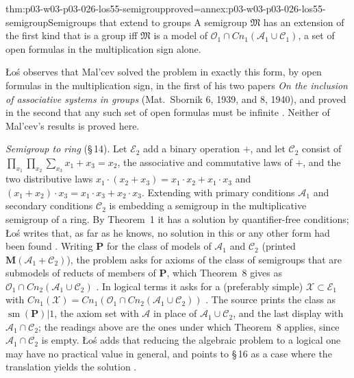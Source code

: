 \begin{hbcorollary}{thm:p03-w03-p03-026-los55-semigroup}{proved=annex:p03-w03-p03-026-los55-semigroup}{Semigroups that extend to groups}
A semigroup \(\mathfrak M\) has an extension of the first kind that is a
group iff \(\mathfrak M\) is a model of
\(\mathcal O_1\cap\mathit{Cn}_1(\mathcal A_1\cup\mathcal C_1)\), a set of open
formulas in the multiplication sign alone.
\end{hbcorollary}

\L o\'s observes that Mal'cev solved the problem in exactly this form, by
open formulas in the multiplication sign, in the first of his two papers
\emph{On the inclusion of associative systems in groups} (Mat.\ Sbornik 6,
1939, and 8, 1940), and proved in the second that any such set of open
formulas must be infinite \cite[p.~51]{Los1955}.  Neither of Mal'cev's
results is proved here.

\emph{Semigroup to ring} (\S\,14).  Let \(\mathcal E_2\) add a binary
operation \(+\), and let \(\mathcal C_2\) consist of
\(\prod_{x_1}\prod_{x_2}\sum_{x_3}x_1+x_3=x_2\), the associative and
commutative laws of \(+\), and the two distributive laws
\(x_1\cdot(x_2+x_3)=x_1\cdot x_2+x_1\cdot x_3\) and
\((x_1+x_2)\cdot x_3=x_1\cdot x_3+x_2\cdot x_3\).  Extending with primary
conditions \(\mathcal A_1\) and secondary conditions \(\mathcal C_2\) is
embedding a semigroup in the multiplicative semigroup of a ring.  By
Theorem~1 it has a solution by quantifier-free conditions; \L o\'s writes
that, as far as he knows, no solution in this or any other form had been
found \cite[p.~51]{Los1955}.  Writing \(\mathbf P\) for the class of models
of \(\mathcal A_1\) and \(\mathcal C_2\) (printed
\(\mathbf M(\mathcal A_1+\mathcal C_2)\)), the problem asks for axioms of the
class of semigroups that are submodels of reducts of members of
\(\mathbf P\), which Theorem~8 gives as
\(\mathcal O_1\cap\mathit{Cn}_2(\mathcal A_1\cup\mathcal C_2)\)
\cite[p.~51]{Los1955}.  In logical terms it asks for a (preferably simple)
\(\mathcal X\subset\mathcal E_1\) with
\(\mathit{Cn}_1(\mathcal X)=\mathit{Cn}_1(\mathcal O_1\cap\mathit{Cn}_2(\mathcal A_1\cup\mathcal C_2))\)
\cite[p.~52]{Los1955}.  The source prints the class as
\(\operatorname{sm}(\mathbf P)|1\), the axiom set with \(\mathcal A\) in place
of \(\mathcal A_1\cup\mathcal C_2\), and the last display with
\(\mathcal A_1\cap\mathcal C_2\); the readings above are the ones under which
Theorem~8 applies, since \(\mathcal A_1\cap\mathcal C_2\) is empty.  \L o\'s
adds that reducing the algebraic problem to a logical one may have no
practical value in general, and points to \S\,16 as a case where the
translation yields the solution \cite[p.~52]{Los1955}.

